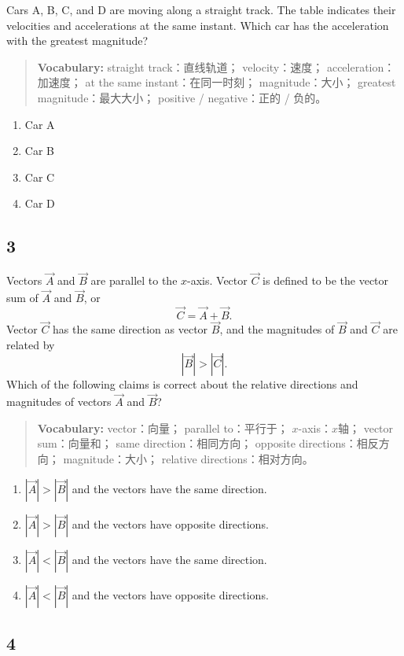 \documentclass[12pt,a4paper]{article}
\newcommand{\vocab}[1]{
\begin{quote}
\small
\textbf{Vocabulary:} #1
\end{quote}
}
\begin{document}
Cars A, B, C, and D are moving along a straight track. The table indicates their velocities and accelerations at the same instant. Which car has the acceleration with the greatest magnitude?

\vocab{
straight track：直线轨道；
velocity：速度；
acceleration：加速度；
at the same instant：在同一时刻；
magnitude：大小；
greatest magnitude：最大大小；
positive / negative：正的 / 负的。
}

\begin{enumerate}[label=(\Alph*)]
    \item Car A
    \item Car B
    \item Car C
    \item Car D
\end{enumerate}

\subsection*{3}

Vectors $\vec{A}$ and $\vec{B}$ are parallel to the $x$-axis. Vector $\vec{C}$ is defined to be the vector sum of $\vec{A}$ and $\vec{B}$, or
\[
\vec{C}=\vec{A}+\vec{B}.
\]
Vector $\vec{C}$ has the same direction as vector $\vec{B}$, and the magnitudes of $\vec{B}$ and $\vec{C}$ are related by
\[
|\vec{B}|>|\vec{C}|.
\]
Which of the following claims is correct about the relative directions and magnitudes of vectors $\vec{A}$ and $\vec{B}$?

\vocab{
vector：向量；
parallel to：平行于；
$x$-axis：$x$轴；
vector sum：向量和；
same direction：相同方向；
opposite directions：相反方向；
magnitude：大小；
relative directions：相对方向。
}

\begin{enumerate}[label=(\Alph*)]
    \item $|\vec{A}|>|\vec{B}|$ and the vectors have the same direction.
    \item $|\vec{A}|>|\vec{B}|$ and the vectors have opposite directions.
    \item $|\vec{A}|<|\vec{B}|$ and the vectors have the same direction.
    \item $|\vec{A}|<|\vec{B}|$ and the vectors have opposite directions.
\end{enumerate}

\subsection*{4}
\end{document}
